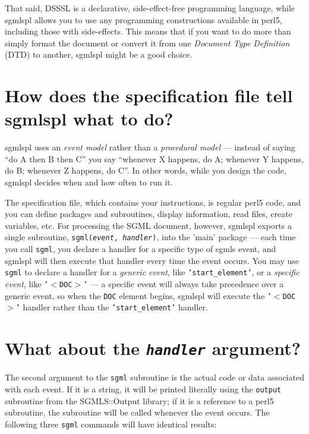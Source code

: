 That said, {\sc DSSSL} is a declarative,
side-effect-free programming language, while {\sc sgmlspl} allows you to
use any programming constructions available in {\sc perl5}, including
those with side-effects.  This means that if you want to do more than
simply format the document or convert it from one {\em Document
Type Definition\/} ({\sc DTD}) to another,
{\sc sgmlspl} might be a good choice.




\section{How does the specification file tell {\sc sgmlspl} what to do?}
\label{SPECS}


{\sc sgmlspl} uses an {\em event model\/} rather than
a {\em procedural model\/} {---} instead of
saying {``}do A then B then C{''} you say {``}whenever X
happens, do A; whenever Y happens, do B; whenever Z happens, do
C{''}.  In other words, while you design the code, {\sc sgmlspl}
decides when and how often to run it.

The specification file, which contains your instructions, is
regular {\sc perl5} code, and you can define packages and subroutines,
display information, read files, create variables, etc.  For
processing the {\sc SGML} document, however, {\sc sgmlspl} exports a single
subroutine, {\tt sgml({\tt\sl event\/},
{\tt\sl handler\/})}, into the 'main' package
{---} each time you call {\tt sgml}, you declare a
handler for a specific type of {\sc sgmls} event, and {\sc sgmlspl} will then
execute that handler every time the event occurs.  You may use
{\tt sgml} to declare a handler for a {\em generic event\/}, like
{\tt 'start\_element'}, or a {\em specific event\/},
like {\tt '$<$DOC$>$'} {---} a specific event will
always take precedence over a generic event, so when the
{\tt DOC} element begins, {\sc sgmlspl} will execute the
{\tt '$<$DOC$>$'} handler rather than the
{\tt 'start\_element'} handler.




\section{What about the {\tt\sl handler\/} argument?}
\label{HANDLERS}


The second argument to the {\tt sgml} subroutine is
the actual code or data associated with each event.  If it is a
string, it will be printed literally using the
{\tt output} subroutine from the {\sc SGMLS::Output} library; if
it is a reference to a {\sc perl5} subroutine, the subroutine will be
called whenever the event occurs.  The following three
{\tt sgml} commands will have identical results:

